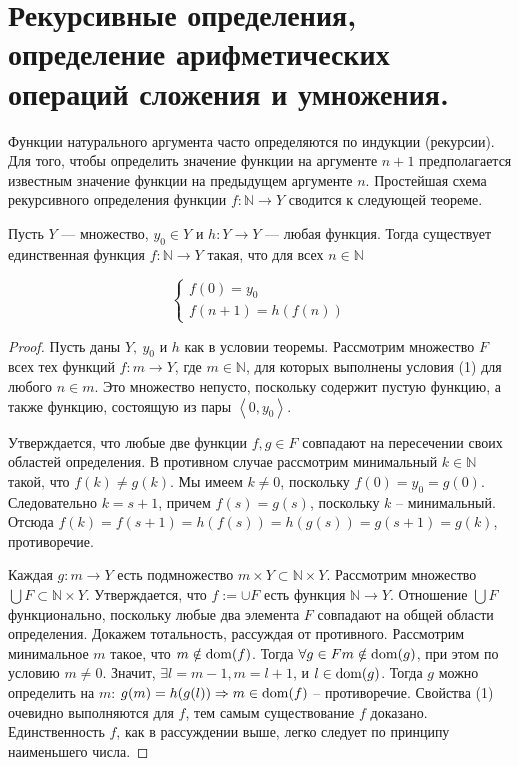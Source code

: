 \section{Рекурсивные определения, определение арифметических операций сложения и умножения.}

Функции натурального аргумента часто определяются по индукции (рекурсии). Для того, чтобы определить значение
функции на аргументе $n+1$ предполагается известным значение функции на предыдущем аргументе $n$. Простейшая схема
рекурсивного определения функции $f: \mathbb{N} \rightarrow Y$ сводится к следующей теореме. 

\begin{theorem}
	Пусть $Y$ — множество, $y_{0} \in Y$ и $h: Y \rightarrow Y$ — любая
	функция. Тогда существует единственная функция $f: \mathbb{N} \rightarrow Y$ такая,
	что для всех $n \in \mathbb{N}$

	\begin{equation}
		\left\{\begin{array}{l}
			{f(0)=y_{0}} \\
			{f(n+1)=h(f(n))}
		\end{array}\right.
	\end{equation}

\end{theorem}

\begin{proof}

	Пусть даны $Y, \ y_0$ и $h$ как в условии теоремы. Рассмотрим множество $F$ всех тех функций $f: m \rightarrow Y$,
	где $m \in \mathbb{N}$, для которых выполнены условия (1) для любого $n \in m$. Это множество непусто,
	поскольку содержит пустую функцию, а также функцию, состоящую из
	пары $\left\langle 0, y_{0}\right\rangle$.

	Утверждается, что любые две функции $f, g \in F$ совпадают на пересечении своих областей определения. В противном
	случае рассмотрим минимальный $k \in \mathbb{N}$ такой, что $f(k) \neq g(k)$. Мы имеем $k \neq 0$, поскольку
	$f(0)=y_{0}=g(0)$. Следовательно $k=s+1$, причем $f(s) = g(s)$, поскольку $k$ -- минимальный. Отсюда
	$f(k)=f(s+1)=h(f(s))=h(g(s))=g(s+1)=g(k)$, противоречие.

	Каждая $g: m \rightarrow Y$ есть подмножество $m \times Y \subset \mathbb{N} \times Y$. Рассмотрим множество
	$\bigcup F \subset \mathbb{N} \times Y$. Утверждается, что $f:=\cup F$ есть функция $\mathbb{N} \rightarrow Y$.
	Отношение $\bigcup F$ функционально, поскольку любые два элемента $F$ совпадают на общей области определения.
	Докажем тотальность, рассуждая от противного. Рассмотрим минимальное $m$ такое, что
	$m \notin \operatorname{dom}(f)$. Тогда $\forall g\in F m\notin\operatorname{dom}(g)$, при этом по условию $m\ne 0$. Значит, $\exists l=m-1,
	m=l+1$, и $l\in\operatorname{dom}(g)$. Тогда $g$ можно определить на $m$: $g(m)=h(g(l))\Rightarrow m\in\operatorname{dom}(f)$ --
	противоречие. Свойства (1) очевидно выполняются для $f$, тем самым существование $f$ доказано.
	Единственность $f$, как в рассуждении выше, легко следует по принципу наименьшего числа.
\end{proof}

